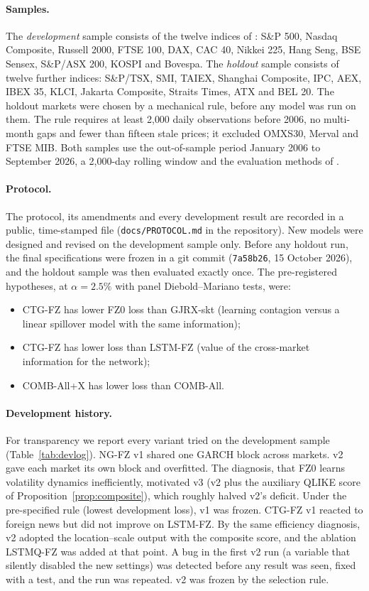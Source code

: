 \paragraph{Samples.} The \emph{development} sample consists of the twelve indices of \citet{agrawal2026learning}: S\&P 500, Nasdaq Composite, Russell 2000, FTSE 100, DAX, CAC 40, Nikkei 225, Hang Seng, BSE Sensex, S\&P/ASX 200, KOSPI and Bovespa. The \emph{holdout} sample consists of twelve further indices: S\&P/TSX, SMI, TAIEX, Shanghai Composite, IPC, AEX, IBEX 35, KLCI, Jakarta Composite, Straits Times, ATX and BEL 20. The holdout markets were chosen by a mechanical rule, before any model was run on them. The rule requires at least 2{,}000 daily observations before 2006, no multi-month gaps and fewer than fifteen stale prices; it excluded OMXS30, Merval and FTSE MIB. Both samples use the out-of-sample period January 2006 to September 2026, a 2{,}000-day rolling window and the evaluation methods of \citet{agrawal2026learning}.

\paragraph{Protocol.} The protocol, its amendments and every development result are recorded in a public, time-stamped file (\texttt{docs/PROTOCOL.md} in the repository). New models were designed and revised on the development sample only. Before any holdout run, the final specifications were frozen in a git commit (\texttt{7a58b26}, 15 October 2026), and the holdout sample was then evaluated exactly once. The pre-registered hypotheses, at $\alpha=2.5\%$ with panel Diebold--Mariano tests, were:
\begin{itemize}
\item[H1] CTG-FZ has lower FZ0 loss than GJRX-skt (learning contagion versus a linear spillover model with the same information);
\item[H2] CTG-FZ has lower loss than LSTM-FZ (value of the cross-market information for the network);
\item[H3] COMB-All+X has lower loss than COMB-All.
\end{itemize}

\paragraph{Development history.} For transparency we report every variant tried on the development sample (Table~\ref{tab:devlog}). NG-FZ v1 shared one GARCH block across markets. v2 gave each market its own block and overfitted. The diagnosis, that FZ0 learns volatility dynamics inefficiently, motivated v3 (v2 plus the auxiliary QLIKE score of Proposition~\ref{prop:composite}), which roughly halved v2's deficit. Under the pre-specified rule (lowest development loss), v1 was frozen. CTG-FZ v1 reacted to foreign news but did not improve on LSTM-FZ. By the same efficiency diagnosis, v2 adopted the location--scale output with the composite score, and the ablation LSTMQ-FZ was added at that point. A bug in the first v2 run (a variable that silently disabled the new settings) was detected before any result was seen, fixed with a test, and the run was repeated. v2 was frozen by the selection rule.

